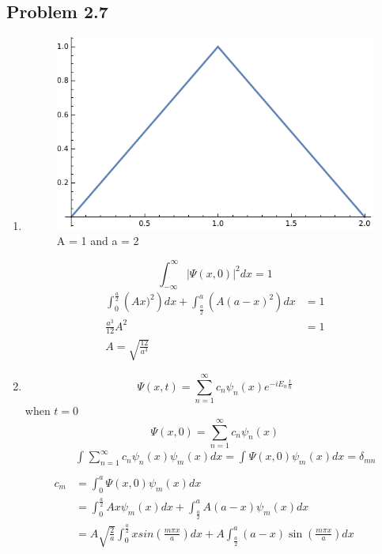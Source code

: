 \documentclass{article}
\begin{document}
\subsection*{Problem 2.7}
\begingroup
\allowdisplaybreaks
    \begin{enumerate}[label=(\alph*)]
        \item 
        \begin{figure}[h]
            \centering
            \includegraphics[width=\linewidth]{graph.pdf}
            \caption{A = 1 and a = 2}
            \label{fig:graph}
          \end{figure} 
        \[\int_{-\infty}^{\infty} |\Psi(x,0)|^2 dx = 1\] 
        \begin{align}
            \int_{0}^{\frac{a}{2}} \left(Ax)^2\right)dx + \int_{\frac{a}{2}}^{a} \left(A(a-x)^2\right)dx &= 1 \\
            \frac{a^3}{12}A^2 &= 1 \\
            A = \sqrt{\frac{12}{a^3}}
        \end{align}
        \item
        \[\Psi(x,t) =  \sum_{n=1}^{\infty}c_n \psi_n(x) e^{-iE_n\frac{t}{\hbar}}\]
        when \(t=0\)
        \[\Psi(x,0) = \sum_{n=1}^{\infty}  c_n\psi_n(x)\]
        \begin{align}
            &\int_{}^{} \sum_{n=1}^{\infty} c_n\psi_n(x)\psi_m(x)dx = \int_{}^{} \Psi(x,0)\psi_m(x)dx = \delta_{mn} \\
            \\
            c_m &= \int_{0}^{a} \Psi(x,0)\psi_m(x)dx \\
            &= \int_{0}^{\frac{a}{2}} Ax \psi_m(x)dx + \int_{\frac{a}{2}}^{a} A(a-x)\psi_m(x)dx \\
            &= A\sqrt{\frac{2}{a}}\int_{0}^{\frac{a}{2}} x sin\left(\frac{m\pi x}{a}\right)dx + A\int_{\frac{a}{2}}^{a} (a-x)\sin\left(\frac{m\pi x}{a}\right)dx \\

\end{align}
\end{enumerate}
\end{document}
